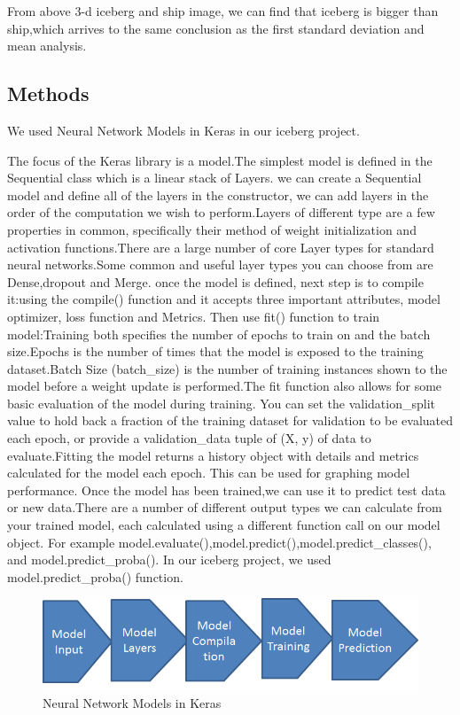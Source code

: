 \documentclass[fleqn,10pt]{SelfArx} %
\begin{document}
From above 3-d iceberg and ship image, we can find that iceberg is bigger than ship,which arrives to the same conclusion as the first standard deviation and mean analysis.\\



\subsection{Methods}
We used Neural Network Models in Keras in our iceberg project.\

The focus of the Keras library is a model.The simplest model is defined in the Sequential class which is a linear stack of Layers.
we can create a Sequential model and define all of the layers in the constructor, we can add layers in the order of the computation we wish to perform.Layers of different type are a few properties in common, specifically their method of weight initialization and activation functions.There are a large number of core Layer types for standard neural networks.Some common and useful layer types you can choose from are Dense,dropout and Merge.
once the model is defined, next step is to compile it:using the compile() function and it accepts three important attributes, model optimizer, loss function and Metrics.
Then use fit() function to train model:Training both specifies the number of epochs to train on and the batch size.Epochs is the number of times that the model is exposed to the training dataset.Batch Size (batch\_size) is the number of training instances shown to the model before a weight update is performed.The fit function also allows for some basic evaluation of the model during training. You can set the validation\_split value to hold back a fraction of the training dataset for validation to be evaluated each epoch, or provide a validation\_data tuple of (X, y) of data to evaluate.Fitting the model returns a history object with details and metrics calculated for the model each epoch. This can be used for graphing model performance.
Once the model has been trained,we can use it to predict test data or new data.There are a number of different output types we can calculate from your trained model, each calculated using a different function call on our model object. For example
model.evaluate(),model.predict(),model.predict\_classes(), and model.predict\_proba(). In our iceberg project, we used model.predict\_proba() function.

\begin{figure}[ht]\centering
\includegraphics[width=\linewidth]{Kerasmodel}
\caption{Neural Network Models in Keras}
\label{fig:Kerasmodel}
\end{figure}
\end{document}
